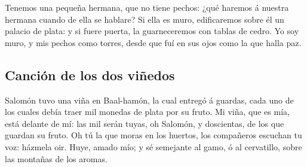 Tenemos una pequeña hermana, que no tiene pechos: ¿qué
haremos á nuestra hermana cuando de ella se hablare?  Si
ella es muro, edificaremos sobre él un palacio de plata: y si fuere
puerta, la guarneceremos con tablas de cedro.  Yo soy
muro, y mis pechos como torres, desde que fuí en sus ojos como la que
halla paz.

\hypertarget{canciuxf3n-de-los-dos-viuxf1edos}{%
\subsection{Canción de los dos
viñedos}\label{canciuxf3n-de-los-dos-viuxf1edos}}

 Salomón tuvo una viña en Baal-hamón, la cual entregó á
guardas, cada uno de los cuales debía traer mil monedas de plata por su
fruto.  Mi viña, que es mía, está delante de mí: las mil
serán tuyas, oh Salomón, y doscientas, de los que guardan su fruto.
 Oh tú la que moras en los huertos, los compañeros
escuchan tu voz: házmela oir.  Huye, amado mío; y sé
semejante al gamo, ó al cervatillo, sobre las montañas de los aromas.
